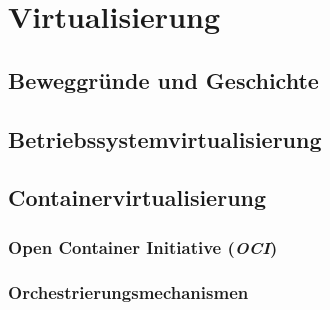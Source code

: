 \chapter{Virtualisierung}
\label{cha:virtualisierung}
\section{Beweggründe und Geschichte}
\label{sec:virtualisierungsgeschichte}
\section{Betriebssystemvirtualisierung}
\label{sec:betriebssystemvirtualisierung}
\section{Containervirtualisierung}
\label{sec:containervirtualisierung}
\subsection{Open Container Initiative (\emph{OCI})}
\label{sec:open-container-initiative}
\subsection{Orchestrierungsmechanismen}
\label{sec:orchestrierungsmechanismen}

